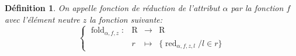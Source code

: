 \documentclass[french]{article}
\DeclareMathOperator{\R}{R}
\DeclareMathOperator{\redu}{red}
\newcommand{\fold}[3]{\operatorname{fold}_{#1, #2, #3}}
\newcommand{\foldAlphafz}{\fold{\alpha}{f}{z}}
\newtheorem{defi}{Définition}
\begin{document}
\begin{defi}
	On appelle \emph{fonction de réduction de l'attribut $\alpha$
		par la fonction $f$ avec l'élément neutre $z$} la fonction suivante:
	$$
	\left\lbrace
	\begin{array}{llcl}
	\foldAlphafz : & \R & \rightarrow & \R \\
				& r 	& \mapsto & \{ \redu_{\alpha, f, z, l} / l\in r \}
	\end{array}
	\right.
	$$
\end{defi}
\end{document}
